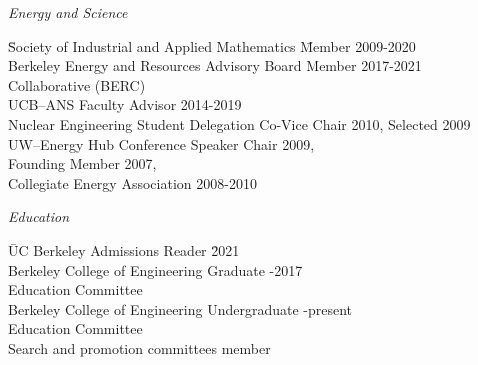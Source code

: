 \textit{Energy and Science}
\begin{tabbing}
\hspace*{4 em}\= Society of Industrial and Applied  Mathematics  \hspace*{1em} \= Member 2009-2020\\
%
\> Berkeley Energy and Resources \> Advisory Board Member 2017-2021 \\
\> \hspace*{4 em} Collaborative (BERC) \\
%
\> UCB--ANS \> Faculty Advisor 2014-2019  \\
%
%
%
\> Nuclear Engineering Student Delegation \> Co-Vice Chair 2010, Selected 2009\\
%
\> UW--Energy Hub \> Conference Speaker Chair 2009, \\
\> \> Founding Member 2007,  \\ \> \> Collegiate Energy Association 2008-2010\\
%
%
%
\end{tabbing}


\textit{Education}
\begin{tabbing}
\hspace*{2 em}\= UC Berkeley Admissions Reader \hspace*{10em} \= 2021\\ 
%
\> Berkeley College of Engineering Graduate -2017\\ 
\> \hspace*{2 em}Education Committee\\
%
\> Berkeley College of Engineering Undergraduate -present\\ 
\> \hspace*{2 em}Education Committee\\
%
\> Search and promotion committees \> member
\end{tabbing}

